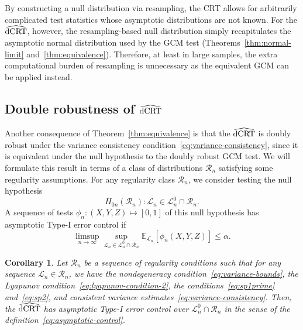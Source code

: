 \documentclass[aos]{imsart}
\theoremstyle{plain}
\newtheorem{corollary}{Corollary}
\theoremstyle{remark}
\newcommand{\E}{\mathbb E}								%
\newcommand{\V}{\mathrm{Var}}							%
\renewcommand{\P}{\mathbb{P}}							%
\newcommand{\srx}{X}									%
\newcommand{\srz}{Z}									%
\newcommand{\sry}{Y}									%
\newcommand{\law}{\mathcal L}							%
\newcommand{\nulllaws}{\mathscr L^0}					%
\newcommand{\regclass}{\mathscr R}					    %
\newcommand{\lawhat}{\widehat{\mathcal L}}				%
\newcommand{\dCRThat}{\widehat{\textnormal{dCRT}}}		%
\begin{document}
By constructing a null distribution via resampling, the CRT allows for arbitrarily complicated test statistics whose asymptotic distributions are not known. For the $\dCRThat$, however, the resampling-based null distribution simply recapitulates the asymptotic normal distribution used by the GCM test (Theorems~\ref{thm:normal-limit} and~\ref{thm:equivalence}). Therefore, at least in large samples, the extra computational burden of resampling is unnecessary as the equivalent GCM can be applied instead.

\subsection{Double robustness of $\dCRThat$} \label{sec:double-robustness}

Another consequence of Theorem~\ref{thm:equivalence} is that the $\dCRThat$ is doubly robust under the variance consistency condition~\eqref{eq:variance-consistency}, since it is equivalent under the null hypothesis to the doubly robust GCM test. We will formulate this result in terms of a class of distributions $\regclass_n$ satisfying some regularity assumptions. For any regularity class $\regclass_n$, we consider testing the null hypothesis 
\begin{equation*}
H_{0n}(\regclass_n): \law_n \in \nulllaws_n \cap \regclass_n. 
\end{equation*}
A sequence of tests $\phi_n: (\srx, \sry, \srz) \mapsto [0,1]$ of this null hypothesis has asymptotic Type-I error control if
\begin{equation}
    \limsup_{n \rightarrow \infty}\sup_{\law_n \in \nulllaws_n \cap \regclass_n} \E_{\law_n}[\phi_n(\srx,\sry,\srz)] \leq \alpha.
    \label{eq:asymptotic-control}
\end{equation}


\begin{corollary} \label{cor:dcrt-double-robustness}
    Let $\regclass_n$ be a sequence of regularity conditions such that for any sequence $\law_n \in \regclass_n$, we have the nondegeneracy condition~\eqref{eq:variance-bounds}, the Lyapunov condition~\eqref{eq:lyapunov-condition-2}, the conditions~\eqref{eq:sp1prime} and~\eqref{eq:sp2}, and consistent variance estimates~\eqref{eq:variance-consistency}. Then, the $\dCRThat$ has asymptotic Type-I error control over $\nulllaws_n \cap \regclass_n$ in the sense of the definition~\eqref{eq:asymptotic-control}.
\end{corollary}
\end{document}
